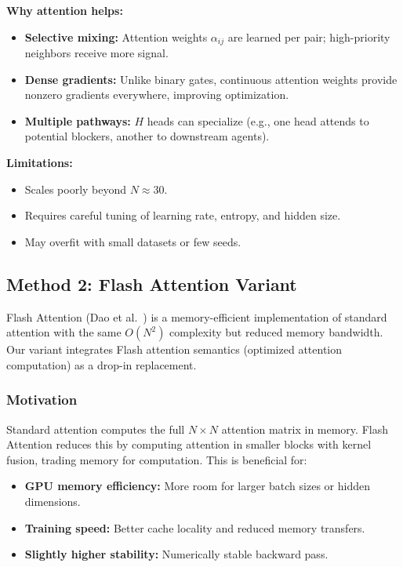 \textbf{Why attention helps:}
\begin{itemize}
    \item \textbf{Selective mixing:} Attention weights $\alpha_{ij}$ are learned per pair; high-priority neighbors receive more signal.
    \item \textbf{Dense gradients:} Unlike binary gates, continuous attention weights provide nonzero gradients everywhere, improving optimization.
    \item \textbf{Multiple pathways:} $H$ heads can specialize (e.g., one head attends to potential blockers, another to downstream agents).
\end{itemize}

\textbf{Limitations:}
\begin{itemize}
    \item Scales poorly beyond $N \approx 30$.
    \item Requires careful tuning of learning rate, entropy, and hidden size.
    \item May overfit with small datasets or few seeds.
\end{itemize}


\subsection{Method 2: Flash Attention Variant}
\label{subsec:flash}

Flash Attention (Dao et al.~\cite{flash-attn}) is a memory-efficient implementation of standard attention with the same $O(N^2)$ complexity but reduced memory bandwidth. Our variant integrates Flash attention semantics (optimized attention computation) as a drop-in replacement.

\subsubsection{Motivation}

Standard attention computes the full $N \times N$ attention matrix in memory. Flash Attention reduces this by computing attention in smaller blocks with kernel fusion, trading memory for computation. This is beneficial for:
\begin{itemize}
    \item \textbf{GPU memory efficiency:} More room for larger batch sizes or hidden dimensions.
    \item \textbf{Training speed:} Better cache locality and reduced memory transfers.
    \item \textbf{Slightly higher stability:} Numerically stable backward pass.
\end{itemize}


